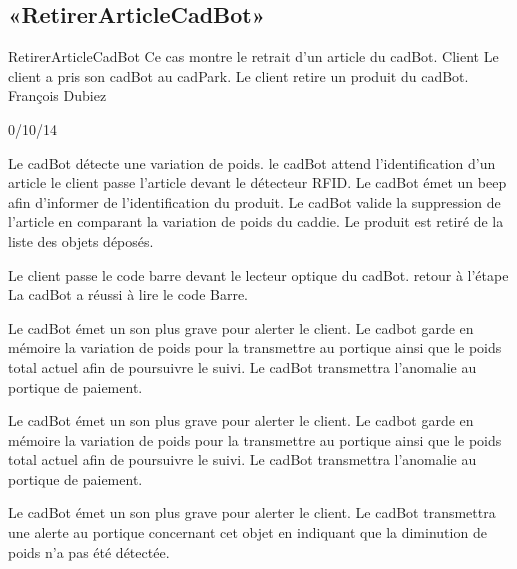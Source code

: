 \subsection[SS:CUD:RAC]{«RetirerArticleCadBot»}

\startCU
\nom RetirerArticleCadBot
\but Ce cas montre le retrait d'un article du cadBot.
\acteur Client
\precondition Le client a pris son cadBot au cadPark.
\declenchement Le client retire un produit du cadBot.
\auteur François Dubiez
\date 30/10/14

\nominal %
\startnominal
\etape Le cadBot détecte une variation de poids.
\etape le cadBot attend l'identification d'un article
 le client passe l'article devant le détecteur RFID.
\etape[RAC:SA1] Le cadBot émet un beep afin d'informer de l'identification du produit.
\etape[RAC:SA3] Le cadBot valide la suppression de l'article en comparant la variation de poids du caddie.
\stopnominal
\postcondition Le produit est retiré de la liste des objets déposés.

\alternatif %
  \etape Le client passe le code barre devant le lecteur optique du cadBot.
  \etape retour à l'étape \in[RAC:SA1]
\stopcondition
\postcondition La cadBot a réussi à lire le code Barre.
\stopalternatif

\exceptions
{}
   \etape Le cadBot émet un son plus grave pour alerter le client.
   \etape Le cadbot garde en mémoire la variation de poids pour la transmettre au portique ainsi que le poids total actuel afin de poursuivre le suivi.
\stopcondition
\postcondition Le cadBot transmettra l'anomalie au portique de paiement.
\stopalternatif

\startalternatif[RAC:SA1]
   \etape Le cadBot émet un son plus grave pour alerter le client.
   \etape Le cadbot garde en mémoire la variation de poids pour la transmettre au portique ainsi que le poids total actuel afin de poursuivre le suivi.
\stopcondition
\postcondition Le cadBot transmettra l'anomalie au portique de paiement.
\stopalternatif

\startalternatif[RAC:SA3]
   \etape Le cadBot émet un son plus grave pour alerter le client.
\stopcondition
\postcondition Le cadBot transmettra une alerte au portique concernant cet objet en indiquant que la diminution de poids n'a pas été détectée.
\stopalternatif

\stopCU
